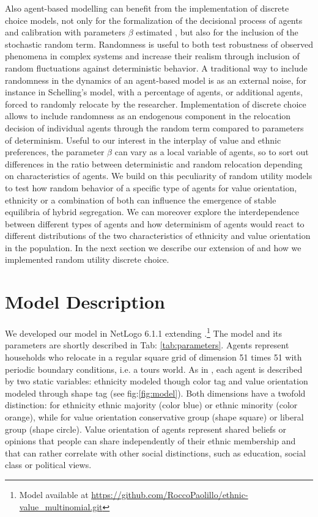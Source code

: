 \documentclass{article}
\begin{document}
Also agent-based modelling can benefit from the implementation of discrete choice models, not only for the formalization of the decisional process of agents and calibration with parameters $\beta$ estimated \autocite{bruch2006neighborhood}, but also for the inclusion of the stochastic random term. Randomness is useful to both test robustness of observed phenomena in complex systems and increase their realism through inclusion of random fluctuations against deterministic behavior. A traditional way to include randomness in the dynamics of an agent-based model is as an external noise, for  instance in Schelling's model, with a percentage of agents, or additional agents, forced to randomly relocate by the researcher. Implementation of discrete choice allows to include randomness as an endogenous component in the relocation decision of individual agents through the random term compared to parameters of determinism. Useful to our interest in the interplay of value and ethnic preferences, the parameter $\beta$ can vary as a local variable of agents, so to sort out differences in the ratio between deterministic and random relocation depending on characteristics of agents. We build on this peculiarity of random utility models to test how random behavior of a specific type of agents for value orientation, ethnicity or a combination of both can influence the emergence of stable equilibria of hybrid segregation. We can moreover explore the interdependence between different types of agents and how determinism of agents would react to different distributions of the two characteristics of ethnicity and value orientation in the population. In the next section we describe our extension of \textcite{paolillo2018} and how we implemented random utility discrete choice.


\section*{Model Description}

We developed our model in NetLogo 6.1.1 \autocite{wilenskynl} extending \textcite{paolillo2018}.\footnote{Model available at \url{https://github.com/RoccoPaolillo/ethnic-value_multinomial.git}} The model and its parameters are shortly described in Tab: \ref{tab:parameters}. Agents represent households who relocate in a regular square grid of dimension 51 times 51 with periodic boundary conditions, i.e. a tours world.
As in \textcite{paolillo2018}, each agent is described by two static variables: ethnicity modeled though color tag and value orientation modeled through shape tag (see fig:\ref{fig:model}). Both dimensions have a twofold distinction: for ethnicity ethnic majority (color blue) or ethnic minority (color orange), while for value orientation conservative group (shape square) or liberal group (shape circle). Value orientation of agents represent shared beliefs or opinions that people can share independently of their ethnic membership and that can rather correlate with other social distinctions, such as education, social class or political views. 
\end{document}

